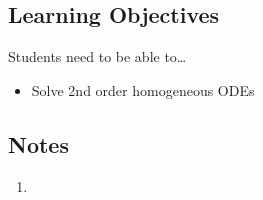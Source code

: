 \subsection*{Learning Objectives}
Students need to be able to\ldots
\begin{itemize}
	\item Solve 2nd order homogeneous ODEs
\end{itemize}

\subsection*{Notes}
	\begin{enumerate}
		\item 
	\end{enumerate}





